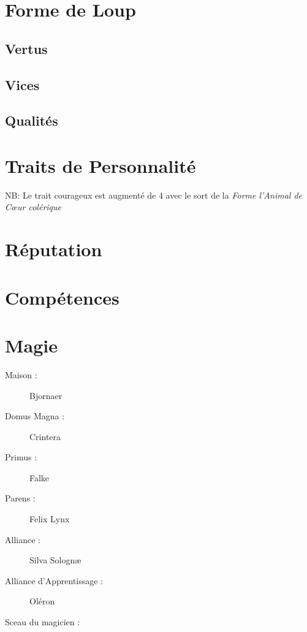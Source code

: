 \begin{multicols*}{2}

\longVFQs

\section*{Forme de Loup}
\renewcommand{\VFQ}{\longVFQ}
\subsection*{Vertus}
\wolfvirtues
\subsection*{Vices}
\wolfflaws
\subsection*{Qualités}
\wolfqualities

\section*{Traits de Personnalité}

\traitslong

NB: Le trait courageux est augmenté de 4 avec le sort de la \emph{Forme l'Animal de Cœur colérique}

\section*{Réputation}

\reputationslong

\section*{Compétences}

\abilitieslong

\end{multicols*}

\pagebreak

\section*{Magie}
\begin{multicols}{2}
\begin{description}
\item[Maison :] Bjornaer
\item[Domus Magna :] Crintera
\item[Primus :] Falke
\item[Parens :] Felix Lynx
\item[Alliance :] Silva Solognæ
\item[Alliance d'Apprentissage :] Oléron
\item[Sceau du magicien :] \magussigil
\end{description}
\end{multicols}

